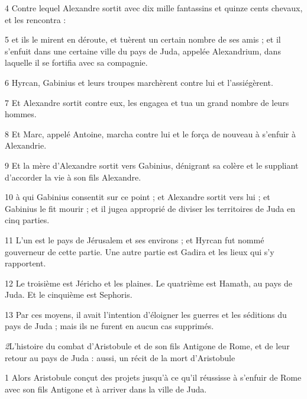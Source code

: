 \par 4 Contre lequel Alexandre sortit avec dix mille fantassins et quinze cents chevaux, et les rencontra :

\par 5 et ils le mirent en déroute, et tuèrent un certain nombre de ses amis ; et il s'enfuit dans une certaine ville du pays de Juda, appelée Alexandrium, dans laquelle il se fortifia avec sa compagnie.

\par 6 Hyrcan, Gabinius et leurs troupes marchèrent contre lui et l'assiégèrent.

\par 7 Et Alexandre sortit contre eux, les engagea et tua un grand nombre de leurs hommes.

\par 8 Et Marc, appelé Antoine, marcha contre lui et le força de nouveau à s'enfuir à Alexandrie.

\par 9 Et la mère d'Alexandre sortit vers Gabinius, dénigrant sa colère et le suppliant d'accorder la vie à son fils Alexandre.

\par 10 à qui Gabinius consentit sur ce point ; et Alexandre sortit vers lui ; et Gabinius le fit mourir ; et il jugea approprié de diviser les territoires de Juda en cinq parties.

\par 11 L'un est le pays de Jérusalem et ses environs ; et Hyrcan fut nommé gouverneur de cette partie. Une autre partie est Gadira et les lieux qui s'y rapportent.

\par 12 Le troisième est Jéricho et les plaines. Le quatrième est Hamath, au pays de Juda. Et le cinquième est Sephoris.

\par 13 Par ces moyens, il avait l'intention d'éloigner les guerres et les séditions du pays de Juda ; mais ils ne furent en aucun cas supprimés.


\par \textit2{L'histoire du combat d'Aristobule et de son fils Antigone de Rome, et de leur retour au pays de Juda : aussi, un récit de la mort d'Aristobule}

\par 1 Alors Aristobule conçut des projets jusqu'à ce qu'il réussisse à s'enfuir de Rome avec son fils Antigone et à arriver dans la ville de Juda.

